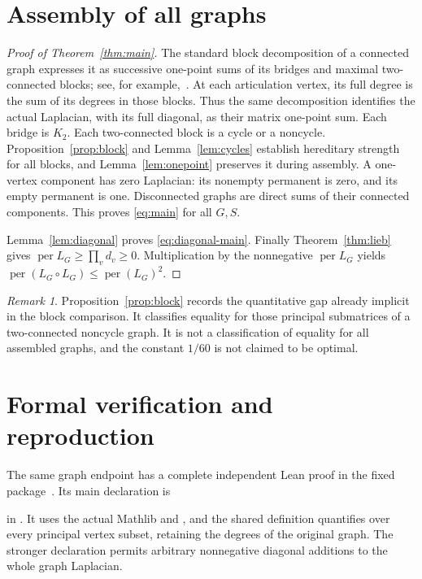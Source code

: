 \documentclass[11pt]{article}
\theoremstyle{remark}\newtheorem{remark}[theorem]{Remark}
\DeclareMathOperator{\per}{per}
\begin{document}
\section{Assembly of all graphs}\label{sec:assembly}
\begin{proof}[Proof of Theorem~\ref{thm:main}]
The standard block decomposition of a connected graph expresses it as
successive one-point sums of its bridges and maximal two-connected
blocks; see, for example,~\cite[Chapter 3]{Diestel}.
At each articulation vertex, its full degree is the sum of its degrees
in those blocks. Thus the same decomposition identifies the actual
Laplacian, with its full diagonal, as their matrix one-point sum.
Each bridge is $K_2$. Each two-connected block is a cycle or a noncycle.
Proposition~\ref{prop:block} and Lemma~\ref{lem:cycles} establish
hereditary strength for all blocks, and Lemma~\ref{lem:onepoint}
preserves it during assembly. A one-vertex component has zero Laplacian:
its nonempty permanent is zero, and its empty permanent is one.
Disconnected graphs are direct sums of their connected components.
This proves \eqref{eq:main} for all $G,S$.

Lemma~\ref{lem:diagonal} proves \eqref{eq:diagonal-main}. Finally
Theorem~\ref{thm:lieb} gives $\per L_G\ge\prod_v d_v\ge0$.
Multiplication by the nonnegative $\per L_G$ yields
$\per(L_G\circ L_G)\le\per(L_G)^2$.
\end{proof}

\begin{remark}
Proposition~\ref{prop:block} records the quantitative gap already
implicit in the block comparison. It classifies equality for those
principal submatrices of a two-connected noncycle graph. It is not a
classification of equality for all assembled graphs, and the constant
$1/60$ is not claimed to be optimal.
\end{remark}

\section{Formal verification and reproduction}\label{sec:formal}
The same graph endpoint has a complete independent Lean proof in the
fixed package~\cite{LeanArchive}. Its main declaration is
\begin{quote}\small{}\end{quote}
in . It uses the actual Mathlib
 and , and the shared
 definition quantifies over every principal vertex
subset, retaining the degrees of the original graph. The stronger
declaration  permits arbitrary
nonnegative diagonal additions to the whole graph Laplacian.
\end{document}
